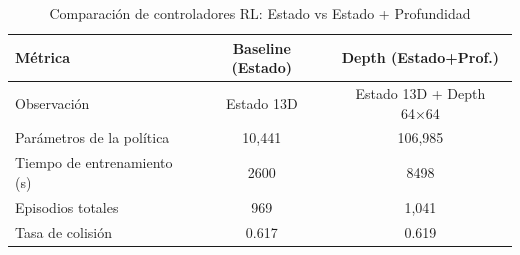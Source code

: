 \begin{table}[h]
\centering
\caption{Comparación de controladores RL: Estado vs Estado + Profundidad}
\label{tab:rl_comparison}
\begin{tabular}{lcc}
\toprule
\textbf{Métrica} & \textbf{Baseline (Estado)} & \textbf{Depth (Estado+Prof.)} \\
\midrule
Observación & Estado 13D & Estado 13D + Depth 64×64 \\
Parámetros de la política & 10,441 & 106,985 \\
Tiempo de entrenamiento (s) & 2600 & 8498 \\
Episodios totales & 969 & 1,041 \\
Tasa de colisión & 0.617 & 0.619 \\
\bottomrule
\end{tabular}
\end{table}
